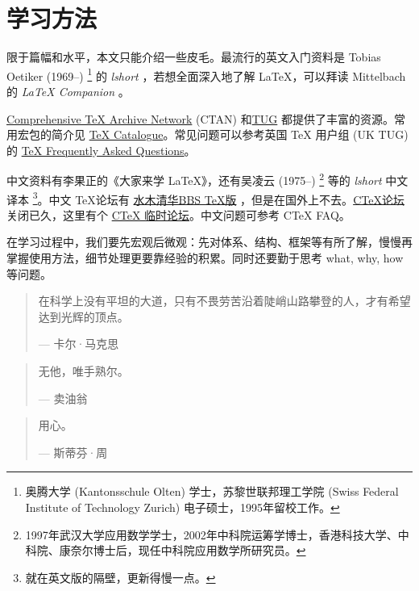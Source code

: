 \section{学习方法}

限于篇幅和水平，本文只能介绍一些皮毛。最流行的英文入门资料是 Tobias Oetiker (1969--)\indexOetiker{} \footnote{奥腾大学 (Kantonsschule Olten) 学士，苏黎世联邦理工学院 (Swiss Federal Institute of Technology Zurich) 电子硕士，1995年留校工作。} 的 \emph{lshort} \citep{Oetiker_lshort}，若想全面深入地了解 \LaTeX ，可以拜读 Mittelbach 的 \emph{\LaTeX{} Companion} \citep{Mittelbach_latex_comp}。

\href{http://www.ctan.org/}{Comprehensive TeX Archive Network} (CTAN) 和\href{http://www.tug.org/}{TUG} 都提供了丰富的资源。常用宏包的简介见 \href{http://www.ctan.org/tex-archive/help/Catalogue/catalogue.html}{TeX Catalogue}。常见问题可以参考英国 TeX 用户组 (UK TUG) 的 \href{http://www.tex.ac.uk/faq/}{TeX Frequently Asked Questions}。

中文资料有李果正\indexLee 的《大家来学 \LaTeX 》\citep{Lee_latex}，还有吴凌云 (1975--)\indexWuLingyun{} \footnote{1997年武汉大学应用数学学士，2002年中科院运筹学博士，香港科技大学、中科院、康奈尔博士后，现任中科院应用数学所研究员。} 等的 \emph{lshort} 中文译本 \footnote{就在英文版的隔壁，更新得慢一点。}。中文 \TeX 论坛有 \href{http://www.smth.org/bbsdoc.php?board=TeX}{水木清华BBS TeX版} ，但是在国外上不去。\href{http://bbs.ctex.org/}{CTeX论坛} 关闭已久，这里有个 \href{https://github.com/CTeX-org/forum}{CTeX 临时论坛}。中文问题可参考 CTeX FAQ\citep{CTeX_faq}。

在学习过程中，我们要先宏观后微观：先对体系、结构、框架等有所了解，慢慢再掌握使用方法，细节处理更要靠经验的积累。同时还要勤于思考 what, why, how 等问题。

\begin{quotation}
在科学上没有平坦的大道，只有不畏劳苦沿着陡峭山路攀登的人，才有希望达到光辉的顶点。
\begin{flushright}
--- 卡尔·马克思
\end{flushright}
\end{quotation}

\begin{quotation}
无他，唯手熟尔。
\begin{flushright}
--- 卖油翁
\end{flushright}
\end{quotation}

\begin{quotation}
用心。
\begin{flushright}
--- 斯蒂芬·周
\end{flushright}
\end{quotation}



